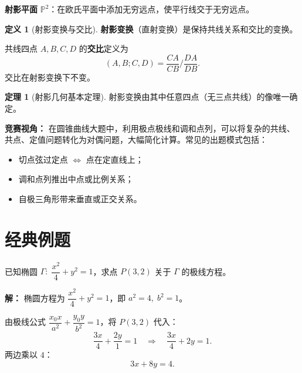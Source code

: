 \documentclass[12pt,a4paper]{ctexart}
\theoremstyle{definition}
\newtheorem*{defn}{定义}
\newtheorem*{thm}{定理}
\newcommand{\pp}{\mathbb{P}}
\begin{document}
\begin{knowledgebox}
\textbf{射影平面} $\pp^2$：在欧氏平面中添加无穷远点，使平行线交于无穷远点。

\begin{defn}[射影变换与交比]
\textbf{射影变换}（直射变换）是保持共线关系和交比的变换。\vspace{3pt}

共线四点 $A,B,C,D$ 的\textbf{交比}定义为
\[
  (A,B;C,D)=\frac{CA}{CB}\bigg/\frac{DA}{DB}.
\]
交比在射影变换下不变。
\end{defn}

\begin{thm}[射影几何基本定理]
射影变换由其中任意四点（无三点共线）的像唯一确定。
\end{thm}

\begin{notebox}
\textbf{竞赛视角：} 在圆锥曲线大题中，利用极点极线和调和点列，可以将复杂的共线、共点、定值问题转化为对偶问题，大幅简化计算。常见的出题模式包括：
\begin{itemize}[leftmargin=1.5em]
  \item 切点弦过定点 $\Longleftrightarrow$ 点在定直线上；
  \item 调和点列推出中点或比例关系；
  \item 自极三角形带来垂直或正交关系。
\end{itemize}
\end{notebox}
\end{knowledgebox}


\section{经典例题}

\begin{examplebox}
已知椭圆 $\Gamma:\;\dfrac{x^2}{4}+y^2=1$，求点 $P(3,2)$ 关于 $\Gamma$ 的极线方程。
\end{examplebox}

\begin{solutionbox}
\textbf{解：}
椭圆方程为 $\dfrac{x^2}{4}+y^2=1$，即 $a^2=4,\;b^2=1$。

由极线公式 $\dfrac{x_0 x}{a^2}+\dfrac{y_0 y}{b^2}=1$，将 $P(3,2)$ 代入：
\[
  \frac{3x}{4}+\frac{2y}{1}=1 \quad\Longrightarrow\quad \frac{3x}{4}+2y=1.
\]
两边乘以 $4$：
\[
  \boxed{3x+8y=4.}
\]
\end{solutionbox}
\end{document}
